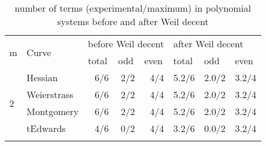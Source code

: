 
\begin{table}[!h]
\centering
\caption{number of terms (experimental/maximum) in polynomial systems before and after Weil decent}
\label{tb:terms}
\begin{tabular}{llrrrrrr}
\hline
\multicolumn{1}{|l|}{\multirow{2}{*}{m}} & \multicolumn{1}{l|}{\multirow{2}{*}{Curve}} & \multicolumn{3}{l|}{before Weil decent}                                                    & \multicolumn{3}{l|}{after Weil decent}                                                           \\ \cline{3-8} 
\multicolumn{1}{|l|}{}                   & \multicolumn{1}{l|}{}                       & \multicolumn{1}{l|}{total}   & \multicolumn{1}{l|}{odd}     & \multicolumn{1}{l|}{even}    & \multicolumn{1}{l|}{total}     & \multicolumn{1}{l|}{odd}       & \multicolumn{1}{l|}{even}      \\ \hline
\multicolumn{1}{|l|}{\multirow{4}{*}{2}} & \multicolumn{1}{l|}{Hessian}                & \multicolumn{1}{r|}{6/6}     & \multicolumn{1}{r|}{2/2}     & \multicolumn{1}{r|}{4/4}     & \multicolumn{1}{r|}{5.2/6}     & \multicolumn{1}{r|}{2.0/2}     & \multicolumn{1}{r|}{3.2/4}     \\ \cline{2-8} 
\multicolumn{1}{|l|}{}                   & \multicolumn{1}{l|}{Weierstrass}            & \multicolumn{1}{r|}{6/6}     & \multicolumn{1}{r|}{2/2}     & \multicolumn{1}{r|}{4/4}     & \multicolumn{1}{r|}{5.2/6}     & \multicolumn{1}{r|}{2.0/2}     & \multicolumn{1}{r|}{3.2/4}     \\ \cline{2-8} 
\multicolumn{1}{|l|}{}                   & \multicolumn{1}{l|}{Montgomery}             & \multicolumn{1}{r|}{6/6}     & \multicolumn{1}{r|}{2/2}     & \multicolumn{1}{r|}{4/4}     & \multicolumn{1}{r|}{5.2/6}     & \multicolumn{1}{r|}{2.0/2}     & \multicolumn{1}{r|}{3.2/4}     \\ \cline{2-8} 
\multicolumn{1}{|l|}{}                   & \multicolumn{1}{l|}{tEdwards}               & \multicolumn{1}{r|}{4/6}     & \multicolumn{1}{r|}{0/2}     & \multicolumn{1}{r|}{4/4}     & \multicolumn{1}{r|}{3.2/6}     & \multicolumn{1}{r|}{0.0/2}     & \multicolumn{1}{r|}{3.2/4}     \\ \hline  \vspace{-3mm}
                                         &                                             &                              &                              &                              &                                &                                &                                \\ \hline

\end{tabular}
\end{table}
